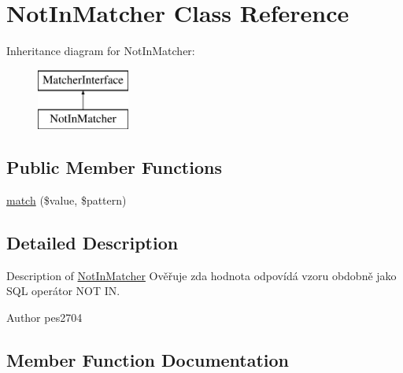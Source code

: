 \hypertarget{class_pes_1_1_query_1_1_matcher_1_1_not_in_matcher}{}\section{Not\+In\+Matcher Class Reference}
\label{class_pes_1_1_query_1_1_matcher_1_1_not_in_matcher}
Inheritance diagram for Not\+In\+Matcher\+:\begin{figure}[H]
\begin{center}
\leavevmode
\includegraphics[height=2.000000cm]{class_pes_1_1_query_1_1_matcher_1_1_not_in_matcher}
\end{center}
\end{figure}
\subsection*{Public Member Functions}
\begin{DoxyCompactItemize}
\item 
\mbox{\hyperlink{class_pes_1_1_query_1_1_matcher_1_1_not_in_matcher_af38750109828e091458dbb0481a2a0d7}{match}} (\$value, \$pattern)
\end{DoxyCompactItemize}


\subsection{Detailed Description}
Description of \mbox{\hyperlink{class_pes_1_1_query_1_1_matcher_1_1_not_in_matcher}{Not\+In\+Matcher}} Ověřuje zda hodnota odpovídá vzoru obdobně jako S\+QL operátor N\+OT IN. \begin{DoxyAuthor}{Author}
pes2704 
\end{DoxyAuthor}


\subsection{Member Function Documentation}
\mbox{\label{class_pes_1_1_query_1_1_matcher_1_1_not_in_matcher_af38750109828e091458dbb0481a2a0d7}} 
